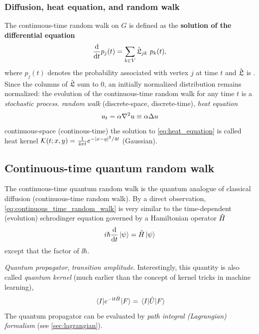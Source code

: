 \subsubsection{Diffusion, heat equation, and random walk}
The continuous-time random walk on $G$ is defined as the \textbf{solution of the differential equation}
\begin{equation}
	\dv{t} p_j(t)
	=
	\sum_{k\in V} \hat{\mathfrak{L}}_{jk} \ p_k(t),
	\label{eq:continuous_time_random_walk}
\end{equation}
where $p_j(t)$ denotes the probability associated with vertex $j$ at time $t$
and $\hat{\mathfrak{L}}$ is .
Since the columns of $\hat{\mathfrak{L}}$ sum to 0,
an initially normalized distribution remains normalized:
the evolution of the continuous-time random walk for any time $t$ is a \emph{stochastic process}.
\emph{random walk} (discrete-space, discrete-time), 
\emph{heat equation} 
\begin{equation}
	u_t = \alpha \laplacian u \equiv \alpha \Delta u
	\label{eq:heat_equation}
\end{equation}
continuous-space (continous-time)
the solution to \cref{eq:heat_equation} is called heat kernel $\mathcal{K}(t;x,y)=\frac{1}{4\pi t} e^{-\abs{x-y}^2/4t}$ (Gaussian).

\subsection{Continuous-time quantum random walk}\label{sec:ct_quantum_walk}
The continuous-time quantum random walk \cite{childsExampleDifferenceQuantum2002} is the quantum analogue of classical diffusion (continuous-time random walk).
By a direct observation, \cref{eq:continuous_time_random_walk} is very similar to the time-dependent (evolution) schrodinger equation governed by a Hamiltonian operator $\hat{H}$
\begin{equation}
	i\hbar \dv{t} \ket{\psi} = \hat{H} \ket{\psi}
	\label{eq:evolution}
\end{equation}
except that the factor of $\ii\hbar$.
\begin{definition}\label{def:quantum_propagator}
	\emph{Quantum propagator}, \emph{transition amplitude}.
	Interestingly, this quantity is also called \emph{quantum kernel} (much earlier than the concept of kernel tricks in machine learning), 
	\begin{equation}
		\mel{I}{e^{-\textup{i}t \hat{H}}}{F}
		=
		\mel{I}{\hat{U}}{F}
	\end{equation}
	The quantum propagator can be evaluated by \emph{path integral (Lagrangian) formalism} (see \cref{sec:lagrangian}).
\end{definition}

